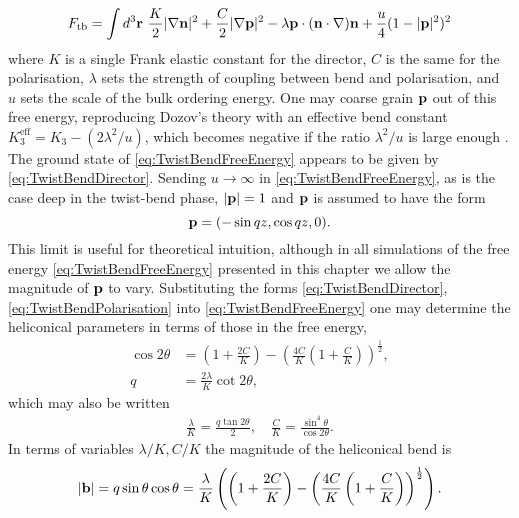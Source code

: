 \begin{equation}
    F_{\mathrm{tb}} =  \int d^3 {\bf r}\ \frac{K}{2}|\nabla {\bf n}|^2 +\frac{C}{2}|\nabla {\bf p}|^2 -\lambda \w p \cdot (\w n \cdot \nabla)\w n + \frac{u}{4}(1 - |\w p|^2)^2
    \label{eq:TwistBendFreeEnergy}
\end{equation}
where $K$ is a single Frank elastic constant for the director, $C$ is the same for the polarisation, $\lambda$ sets the strength of coupling between bend and polarisation, and $u$ sets the scale of the bulk ordering energy. One may coarse grain $\mathbf{p}$ out of this free energy, reproducing Dozov's theory with an effective bend constant $K_3^{\mathrm{eff}} = K_3 - (2\lambda^2/u)$, which becomes negative if the ratio $\lambda^2/u$ is large enough \citep{Shamid2013}. The ground state of \eqref{eq:TwistBendFreeEnergy} appears to be given by \eqref{eq:TwistBendDirector}. Sending $u \rightarrow \infty$ in \eqref{eq:TwistBendFreeEnergy}, as is the case deep in the twist-bend phase, $|\mathbf{p}|=1$ and $\mathbf{p}$ is assumed to have the form  
\begin{equation}
\mathbf{p} = (- \sin q z, \cos q z ,0).
\label{eq:TwistBendPolarisation}
\end{equation}
This limit is useful for theoretical intuition, although in all simulations of the free energy \eqref{eq:TwistBendFreeEnergy} presented in this chapter we allow the magnitude of $\mathbf{p}$ to vary. Substituting the forms \eqref{eq:TwistBendDirector}, \eqref{eq:TwistBendPolarisation} into \eqref{eq:TwistBendFreeEnergy} one may determine the heliconical parameters in terms of those in the free energy,
\begin{align}
    \label{eq:theta}
    \cos 2 \theta &= \left( 1+ \frac{2C}{K} \right) - \left( \frac{4C}{K}  \left( 1+ \frac{C}{K} \right) \right)^\frac{1}{2},\\
    \label{eq:q}
    q &= \frac{2 \lambda}{K} \cot 2 \theta,
\end{align}
which may also be written
\begin{align}
    \frac{\lambda}{K} = \frac{q \tan 2 \theta}{2}, \quad 
    \frac{C}{K} = \frac{\sin^4\theta}{\cos 2 \theta}.
\end{align}
In terms of variables $\lambda/K , C/K$ the magnitude of the heliconical bend is
\begin{align}
    |\mathbf{b}| = q\sin\theta\cos\theta = \frac{\lambda}{K}\left( \left( 1+ \frac{2C}{K} \right) - \left( \frac{4C}{K}  \left( 1+ \frac{C}{K} \right) \right)^\frac{1}{2}\right).
    \label{eq:magb}
\end{align}
